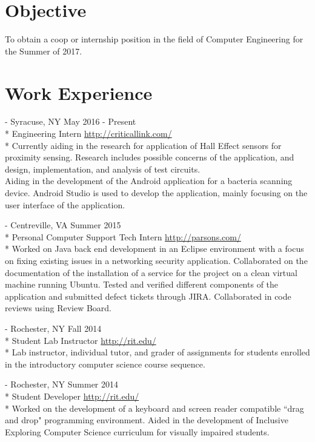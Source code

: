 \documentclass[a4paper,margin,line]{resume}
\newcommand{\rurl}[1]{\hfill {\footnotesize \url{#1}}}
\newcommand{\rdate}[1]{\hfill {\small #1}}
\renewcommand{\employer}[5]{ \item[#1] - #2 \rdate{#3} \\* #4 \rurl{#5} \\*}
\begin{document}
\begin{resume}
\section{\mysidestyle Objective}
    To obtain a coop or internship position in the field of Computer Engineering for the Summer of 2017.
\section{\mysidestyle Work Experience}
	\begin{asparadesc}
        \employer{Critical Link LLC}{Syracuse, NY}{May 2016 - Present}{Engineering Intern}
        {http://criticallink.com/}
        \small
        Currently aiding in the research for application of Hall Effect sensors for proximity sensing.  
        Research includes possible concerns of the application, and design, implementation, and analysis of 
        test circuits.\smallskip\\
        Aiding in the development of the Android application for a bacteria scanning device. Android 
        Studio is used to develop the application, mainly focusing on the user interface of the application.
        \normalsize
        \\
        \employer{Parsons Government Services}{Centreville, VA}{Summer 2015}{Personal Computer Support Tech Intern}
        {http://parsons.com/}
        \small
        Worked on Java back end development in an Eclipse environment with a focus on fixing existing 
        issues in a networking security application. Collaborated on the documentation of the installation 
        of a service for the project on a clean virtual machine running Ubuntu. Tested and verified 
        different components of the application and submitted defect tickets through JIRA.  Collaborated 
        in code reviews using Review Board.
        \normalsize
        \\
        \employer{Rochester Institute of Technology}{Rochester, NY}{Fall 2014}{Student Lab Instructor}
        {http://rit.edu/}
        \small
        Lab instructor, individual tutor, and grader of assignments for students enrolled in the 
        introductory computer science course sequence.
        \normalsize
        \\
        \employer{Rochester Institute of Technology}{Rochester, NY}{Summer 2014}{Student Developer}
        {http://rit.edu/}
        \small
        Worked on the development of a keyboard and screen reader compatible ``drag and drop" programming 
        environment.  Aided in the development of Inclusive Exploring Computer Science curriculum for 
        visually impaired students.
        \normalsize
        \\
    \end{asparadesc}


\end{resume}
\end{document}
